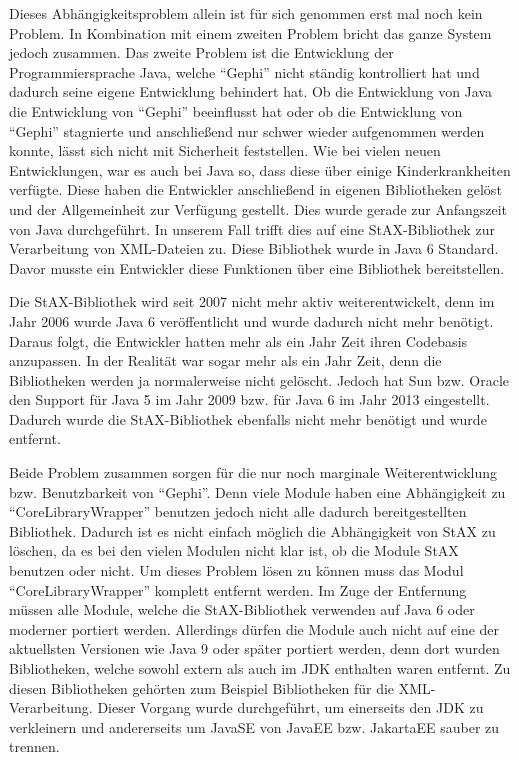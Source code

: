 Dieses Abhängigkeitsproblem allein ist für sich genommen erst mal noch kein
Problem. In Kombination mit einem zweiten Problem bricht das ganze System jedoch
zusammen. Das zweite Problem ist die Entwicklung der Programmiersprache Java,
welche \enquote{Gephi} nicht ständig kontrolliert hat und dadurch seine eigene
Entwicklung behindert hat. Ob die Entwicklung von Java die Entwicklung von
\enquote{Gephi} beeinflusst hat oder ob die Entwicklung von \enquote{Gephi}
stagnierte und anschließend nur schwer wieder aufgenommen werden konnte, lässt
sich nicht mit Sicherheit feststellen. Wie bei vielen neuen Entwicklungen, war es
auch bei Java so, dass diese über einige Kinderkrankheiten verfügte. Diese haben
die Entwickler anschließend in eigenen Bibliotheken gelöst und der Allgemeinheit
zur Verfügung gestellt. Dies wurde gerade zur Anfangszeit von Java durchgeführt.
In unserem Fall trifft dies auf eine StAX-Bibliothek zur Verarbeitung von
\gls{XML}-Dateien zu. Diese Bibliothek wurde in Java 6 Standard. Davor musste ein
Entwickler diese Funktionen über eine Bibliothek bereitstellen. 


Die StAX-Bibliothek wird seit 2007 nicht mehr aktiv weiterentwickelt, denn im
Jahr 2006 wurde Java 6 veröffentlicht und wurde dadurch nicht mehr benötigt.
Daraus folgt, die Entwickler hatten mehr als ein Jahr Zeit ihren Codebasis
anzupassen. In der Realität war sogar mehr als ein Jahr Zeit, denn die
Bibliotheken werden ja normalerweise nicht gelöscht. Jedoch hat Sun bzw. Oracle
den Support für Java 5 im Jahr 2009 bzw. für Java 6 im Jahr 2013 eingestellt.
Dadurch wurde die StAX-Bibliothek ebenfalls nicht mehr benötigt und wurde
entfernt. 

Beide Problem zusammen sorgen für die nur noch marginale Weiterentwicklung bzw.
Benutzbarkeit von \enquote{Gephi}. Denn viele Module haben eine Abhängigkeit zu
\enquote{CoreLibraryWrapper} benutzen jedoch nicht alle dadurch bereitgestellten
Bibliothek. Dadurch ist es nicht einfach möglich die Abhängigkeit von StAX zu
löschen, da es bei den vielen Modulen nicht klar ist, ob die Module StAX benutzen
oder nicht. Um dieses Problem lösen zu können muss das Modul
\enquote{CoreLibraryWrapper} komplett entfernt werden. Im Zuge der Entfernung
müssen alle Module, welche die StAX-Bibliothek verwenden auf Java 6 oder moderner
portiert werden. Allerdings dürfen die Module auch nicht auf eine der aktuellsten
Versionen wie Java 9 oder später portiert werden, denn dort wurden Bibliotheken,
welche sowohl extern als auch im \gls{JDK} enthalten waren entfernt. Zu diesen
Bibliotheken gehörten zum Beispiel Bibliotheken für die \gls{XML}-Verarbeitung.
Dieser Vorgang wurde durchgeführt, um einerseits den JDK zu verkleinern und
andererseits um JavaSE von JavaEE bzw. JakartaEE sauber zu trennen.

